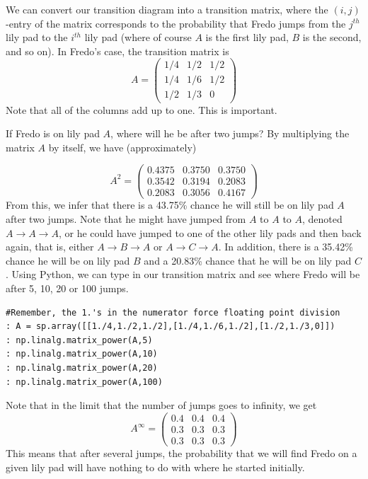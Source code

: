 We can convert our transition diagram into a transition matrix, where the $(i,j)$-entry of the matrix corresponds to the probability that Fredo jumps from the $j^{th}$ lily pad to the $i^{th}$ lily pad (where of course $A$ is the first lily pad, $B$ is the second, and so on).  In Fredo's case, the transition matrix is
\[
A = \begin{pmatrix}
1/4 & 1/2 & 1/2\\
1/4 & 1/6 & 1/2\\
1/2 & 1/3 & 0
\end{pmatrix}
\]
Note that all of the columns add up to one.  This is important.

If Fredo is on lily pad $A$, where will he be after two jumps?  By multiplying the matrix $A$ by itself, we have (approximately)

\[
A^2 = \begin{pmatrix}
0.4375 & 0.3750 & 0.3750\\
0.3542 & 0.3194 & 0.2083\\
0.2083 & 0.3056 & 0.4167
\end{pmatrix}
\]
From this, we infer that there is a 43.75\% chance he will still be on lily pad $A$ after two jumps.  Note that he might have jumped from $A$ to $A$ to $A$, denoted $A \rightarrow A \rightarrow A$, or he could have jumped to one of the other lily pads and then back again, that is, either $A \rightarrow B \rightarrow A$ or $A \rightarrow C \rightarrow A$.  In addition, there is a 35.42\% chance he will be on lily pad $B$ and a 20.83\% chance that he will be on lily pad $C$.  Using Python, we can type in our transition matrix and see where Fredo will be after 5, 10, 20 or 100 jumps.

\begin{lstlisting}[style=python]
#Remember, the 1.'s in the numerator force floating point division
: A = sp.array([[1./4,1./2,1./2],[1./4,1./6,1./2],[1./2,1./3,0]])
: np.linalg.matrix_power(A,5)
: np.linalg.matrix_power(A,10)
: np.linalg.matrix_power(A,20)
: np.linalg.matrix_power(A,100)
\end{lstlisting}

Note that in the limit that the number of jumps goes to infinity, we get
\[
A^\infty = \begin{pmatrix}
0.4 & 0.4 & 0.4\\
0.3 & 0.3 & 0.3\\
0.3 & 0.3 & 0.3
\end{pmatrix}
\]
This means that after several jumps, the probability that we will find Fredo on a given lily pad will have nothing to do with where he started initially.
 
